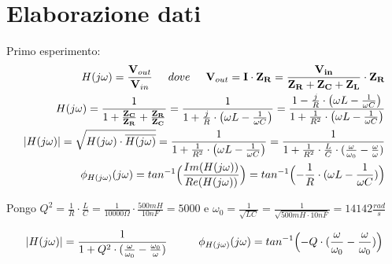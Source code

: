     \section{Elaborazione dati}
    Primo esperimento:
    \begin{equation}
        \begin{split}
            H(j\omega) = \frac{\mathbf{V}_{out}}{\mathbf{V}_{in}}
            \hspace{0.5cm} dove \hspace{0.5cm} \mathbf{V}_{out} = \mathbf{I} \cdot \mathbf{Z_{R}} = \frac{\mathbf{V_{in}}}{\mathbf{Z_R} + \mathbf{Z_C} + \mathbf{Z_L}}
            \cdot \mathbf{Z_R}
            \\
            H(j\omega) =  \frac{1}{1+\frac{\mathbf{Z_C}}{\mathbf{Z_R}} + \frac{\mathbf{Z_R}}{\mathbf{Z_C}}}
            = \frac{1}{1+\frac{j}{R} \cdot \bigl (\omega L - \frac{1}{\omega C} \bigr )} = 
            \frac{1 - \frac{j}{R} \cdot \bigl (\omega L - \frac{1}{\omega C} \bigr )}{1 + \frac{1}{R^2} \cdot \bigl (\omega L - \frac{1}{\omega C} \bigr )}
            \\
            |H(j\omega)| = \sqrt{H(j\omega) \cdot \overline{H(j\omega)}} = \frac{1}{1 + \frac{1}{R^2} \cdot \bigl (\omega L - \frac{1}{\omega C} \bigr )} =
            \frac{1}{1+\frac{1}{R^2}\cdot\frac{L}{C}\cdot(\frac{\omega}{\omega_0} - \frac{\omega}{\omega})} 
            \\
            \phi_{H(j\omega)}(j\omega) = tan^{-1} \Bigl (\frac{Im(H(j\omega))}{Re(H(j\omega))}\Bigr )
            = tan^{-1} \Bigl (-\frac{1}{R} \cdot (\omega L - \frac{1}{\omega C})\Bigr )
        \end{split}
    \end{equation}

    Pongo $Q^2 = \frac{1}{R} \cdot \frac{L}{C} = \frac{1}{10000\Omega} \cdot \frac{500 mH}{10 nF} = 5000$ e $\omega_0 = \frac {1}{\sqrt{LC}}
    = \frac{1}{\sqrt{500mH\cdot10nF}} = 14142\frac{rad}{s}$

    \begin{equation}
        \begin{split}
            |H(j\omega)| = \frac{1}{1 + Q^2 \cdot (\frac{\omega}{\omega_0} - \frac{\omega_0}{\omega})}
            \hspace{1cm}
            \phi_{H(j\omega)}(j\omega) = tan^{-1} \Bigl (-Q \cdot(\frac{\omega}{\omega_0} - \frac{\omega}{\omega_0}) \Bigr )
        \end{split}
    \end{equation}

